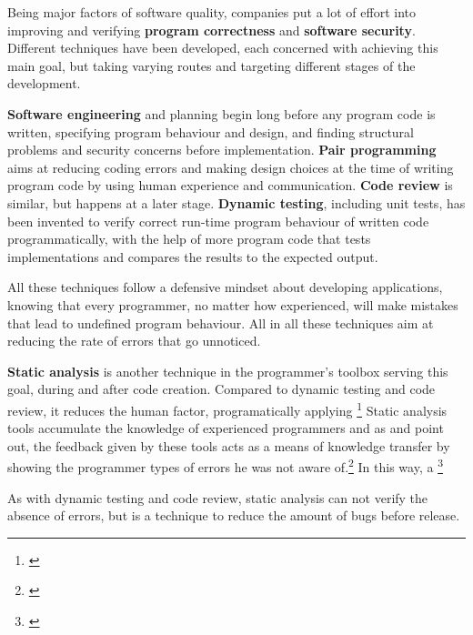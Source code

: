 Being major factors of software quality, companies put a lot of effort into improving and verifying \textbf{program correctness} and \textbf{software security}. Different techniques have been developed, each concerned with achieving this main goal, but taking varying routes and targeting different stages of the development.

\textbf{Software engineering} and planning begin long before any program code is written, specifying program behaviour and design, and finding structural problems and security concerns before implementation. \textbf{Pair programming} aims at reducing coding errors and making design choices at the time of writing program code by using human experience and communication. \textbf{Code review} is similar, but happens at a later stage. \textbf{Dynamic testing}, including unit tests, has been invented to verify correct run-time program behaviour of written code programmatically, with the help of more program code that tests implementations and compares the results to the expected output.

All these techniques follow a defensive mindset about developing applications, knowing that every programmer, no matter how experienced, will make mistakes that lead to undefined program behaviour. All in all these techniques aim at reducing the rate of errors that go unnoticed.

\textbf{Static analysis} is another technique in the programmer's toolbox serving this goal, during and after code creation. Compared to dynamic testing and code review, it reduces the human factor, programatically applying \footnote{\citep[22]{SecureProgramming}} Static analysis tools accumulate the knowledge of experienced programmers and as  and  point out, the feedback given by these tools acts as a means of knowledge transfer by showing the programmer types of errors he was not aware of.\footnote{\citep[22]{SecureProgramming}} In this way, a \footnote{\citep[13]{SecureProgramming}}

As with dynamic testing and code review, static analysis can not verify the absence of errors, but is a technique to reduce the amount of bugs before release.

